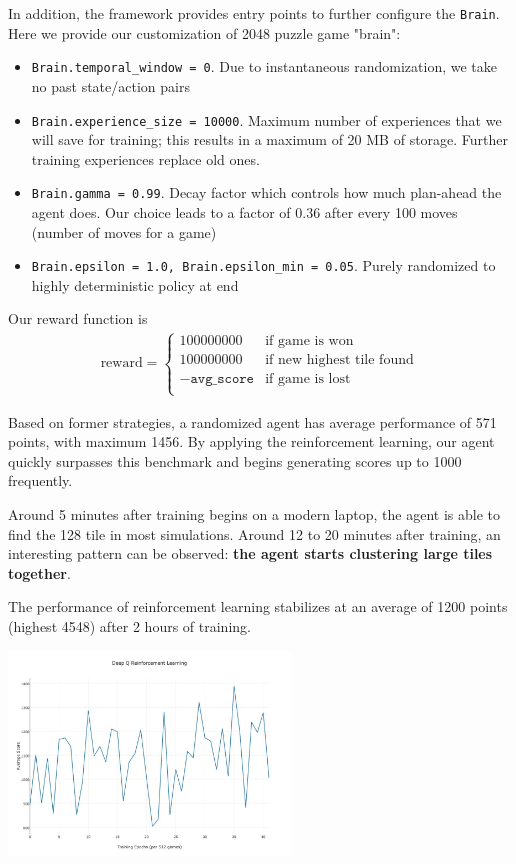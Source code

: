 \documentclass[9pt,twocolumn]{article}
\begin{document}
In addition, the framework provides entry points to further configure the \texttt{Brain}. Here we provide our customization of 2048 puzzle game "brain":

\begin{itemize}

\item \texttt{Brain.temporal\_window = 0}. Due to instantaneous randomization, we take no past state/action pairs
\item \texttt{Brain.experience\_size = 10000}. Maximum number of experiences that we will save for training; this results in a maximum of 20 MB of storage. Further training experiences replace old ones.
\item \texttt{Brain.gamma = 0.99}. Decay factor which controls how much plan-ahead the agent does. Our choice leads to a factor of 0.36 after every 100 moves (number of moves for a game)
\item \texttt{Brain.epsilon = 1.0, Brain.epsilon\_min = 0.05}. Purely randomized to highly deterministic policy at end

\end{itemize}

Our reward function is \begin{align*}
\text{reward} =
\begin{cases}
100000000 & \text{if game is won} \\
100000000 & \text{if new highest tile found} \\
-\texttt{avg\_score} & \text{if game is lost} \\
\end{cases}
\end{align*}

Based on former strategies, a randomized agent has average performance of 571 points, with maximum 1456. By applying the reinforcement learning, our agent quickly surpasses this benchmark and begins generating scores up to 1000 frequently.

Around 5 minutes after training begins on a modern laptop, the agent is able to find the 128 tile in most simulations. Around 12 to 20 minutes after training, an interesting pattern can be observed: \textbf{the agent starts clustering large tiles together}.

The performance of reinforcement learning stabilizes at an average of 1200 points (highest 4548) after 2 hours of training.

\begin{centering}

\includegraphics[width=75mm]{rl_graph.jpg}

\end{centering}
\end{document}
